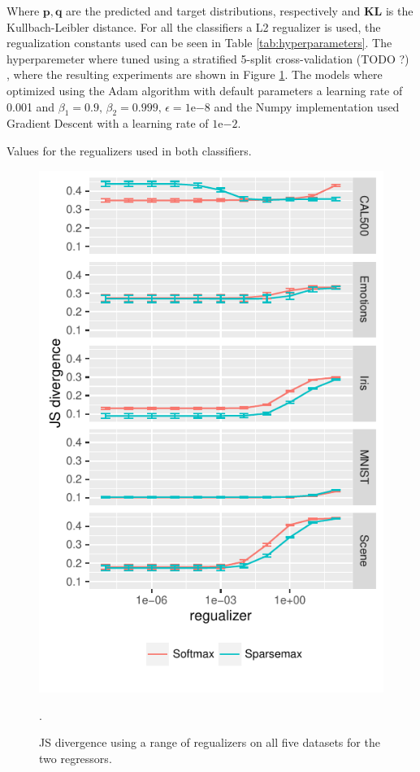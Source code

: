Where $\mathbf{p}, \mathbf{q}$ are the predicted and target distributions, respectively and $\mathbf{KL}$ is the Kullbach-Leibler distance. For all the classifiers a L2 regualizer is used, the regualization constants used can be seen in Table \ref{tab:hyperparameters}. The hyperparemeter where tuned using a stratified 5-split cross-validation (TODO ?) , where the resulting experiments are shown in Figure \ref{fig:hyperparameters}. The models where optimized using the Adam algorithm with default parameters  a learning rate of 0.001 and $\beta_1=0.9, \, \beta_2 = 0.999, \, \epsilon = 1\mathrm{e}{-8}$ and the Numpy implementation used Gradient Descent with a learning rate of $1\mathrm{e}{-2}$.
\begin{table}[H]
\centering

\caption{Values for the regualizers used in both classifiers.}
\label{tab:hyperparameters}
\end{table}
\begin{figure}[H]
	\centering
	\includegraphics[scale=1]{figures/hyperparameter.pdf}
\caption{JS divergence using a range of regualizers on all five datasets for the two regressors.}
\label{fig:hyperparameters}.
\end{figure}

